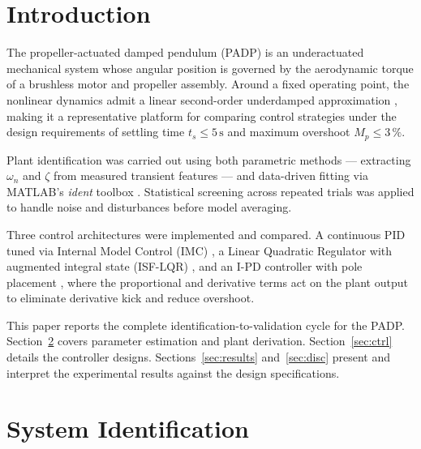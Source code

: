 \documentclass[conference]{IEEEtran}
\begin{document}
\section{Introduction}

The propeller-actuated damped pendulum (PADP) is an underactuated mechanical system whose
angular position is governed by the aerodynamic torque of a brushless motor and propeller
assembly. Around a fixed operating point, the nonlinear dynamics admit a linear second-order
underdamped approximation \cite{ogata2010}, making it a representative platform for comparing
control strategies under the design requirements of settling time $t_s \leq 5\,\text{s}$ and
maximum overshoot $M_p \leq 3\,\%$.

Plant identification was carried out using both parametric methods — extracting $\omega_n$ and
$\zeta$ from measured transient features — and data-driven fitting via MATLAB's \textit{ident}
toolbox \cite{ljung1999}. Statistical screening across repeated trials was applied to handle
noise and disturbances before model averaging.

Three control architectures were implemented and compared. A continuous PID tuned via Internal
Model Control (IMC) \cite{astrom2006}, a Linear Quadratic Regulator with augmented integral
state (ISF-LQR) \cite{anderson1990}, and an I-PD controller with pole placement \cite{visioli2006},
where the proportional and derivative terms act on the plant output to eliminate derivative kick
and reduce overshoot.


This paper reports the complete identification-to-validation cycle for the PADP. Section~\ref{sec:id}
covers parameter estimation and plant derivation. Section~\ref{sec:ctrl} details the controller
designs. Sections~\ref{sec:results} and~\ref{sec:disc} present and interpret the experimental
results against the design specifications.

\section{System Identification}
\label{sec:id}
\end{document}
